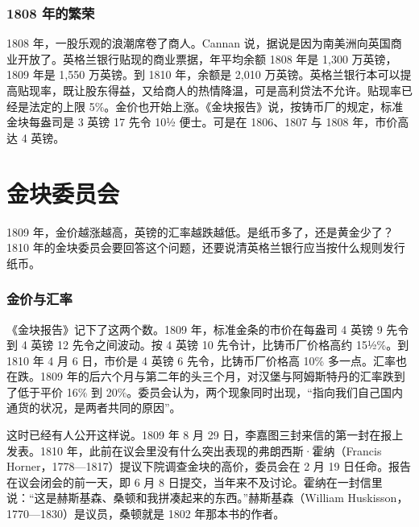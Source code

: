 \subsubsection{1808 年的繁荣}
1808 年，一股乐观的浪潮席卷了商人。Cannan 说，据说是因为南美洲向英国商业开放了\cite{cannan1919}。英格兰银行贴现的商业票据，年平均余额 1808 年是 1,300 万英镑，1809 年是 1,550 万英镑。到 1810 年，余额是 2,010 万英镑\cite{cannan1919}。英格兰银行本可以提高贴现率，既让股东得益，又给商人的热情降温，可是高利贷法不允许\cite{cannan1919}。贴现率已经是法定的上限 5\%。金价也开始上涨。《金块报告》说，按铸币厂的规定，标准金块每盎司是 3 英镑 17 先令 10½ 便士。可是在 1806、1807 与 1808 年，市价高达 4 英镑\cite{bullion1810}。

\section{金块委员会}\label{sec:bullion-report}

1809 年，金价越涨越高，英镑的汇率越跌越低。是纸币多了，还是黄金少了？1810 年的金块委员会要回答这个问题，还要说清英格兰银行应当按什么规则发行纸币。

\subsubsection{金价与汇率}
《金块报告》记下了这两个数。1809 年，标准金条的市价在每盎司 4 英镑 9 先令到 4 英镑 12 先令之间波动。按 4 英镑 10 先令计，比铸币厂价格高约 15½\%。到 1810 年 4 月 6 日，市价是 4 英镑 6 先令，比铸币厂价格高 10\% 多一点\cite{bullion1810}。汇率也在跌。1809 年的后六个月与第二年的头三个月，对汉堡与阿姆斯特丹的汇率跌到了低于平价 16\% 到 20\%\cite{bullion1810}。委员会认为，两个现象同时出现，“指向我们自己国内通货的状况，是两者共同的原因”\cite{bullion1810}。

这时已经有人公开这样说。1809 年 8 月 29 日，李嘉图三封来信的第一封在报上发表\cite{cannan1919}。1810 年，此前在议会里没有什么突出表现的弗朗西斯·霍纳（Francis Horner，1778—1817）提议下院调查金块的高价，委员会在 2 月 19 日任命\cite{cannan1919}。报告在议会闭会的前一天，即 6 月 8 日提交，当年来不及讨论\cite{cannan1919}。霍纳在一封信里说：“这是赫斯基森、桑顿和我拼凑起来的东西。”\cite{cannan1919}赫斯基森（William Huskisson，1770—1830）是议员，桑顿就是 1802 年那本书的作者。

